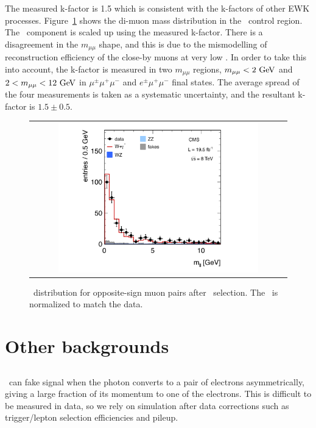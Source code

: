 The measured k-factor is 1.5 which is consistent with the k-factors of other EWK processes. 
Figure~\ref{fig:wg3l} shows the di-muon mass distribution in the \wgammastar\ control region.
The \wgammastar\ component is scaled up using the measured k-factor. 
There is a disagreement in the $m_{\mu\mu}$ shape, and this is due to the mismodelling 
of reconstruction efficiency of the close-by muons at very low \pt. 
In order to take this into account, the k-factor is measured in two $m_{\mu\mu}$ regions, 
$m_{\mu\mu}<2~\mathrm{Ge\kern -0.1em V}$ and $2<m_{\mu\mu}<12~\mathrm{Ge\kern -0.1em V}$ in  $\mu^\pm\mu^+\mu^-$ and $e^\pm\mu^+\mu^-$ 
final states. The average spread of the four measurements is taken as a systematic uncertainty,
and the resultant k-factor is $1.5 \pm 0.5$.

\begin{figure}[htp] 
\centering 
\begin{tabular}{c} 
\includegraphics[width=0.8\textwidth]{figures/Wg3l.pdf} 
\end{tabular} 
\caption{\mll\ distribution for opposite-sign muon pairs after \wgammastar\ selection. 
The \wgammastar\ is normalized to match the data.} 
\label{fig:wg3l} 
\end{figure} 

\section{ Other backgrounds } 

\subsection{\wgamma}

\wgamma\ can fake signal when the photon converts to a pair of electrons asymmetrically, 
giving a large fraction of its momentum to one of the electrons. 
This is difficult to be measured 
in data, so we rely on simulation after data corrections such as trigger/lepton selection 
efficiencies and pileup.

